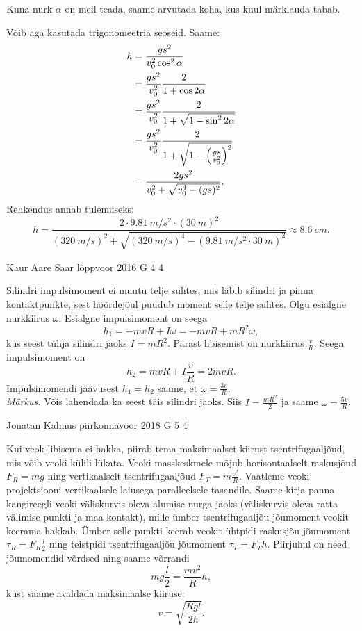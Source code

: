 \documentclass[11pt]{article}
\begin{document}
{{Kuna nurk $\alpha$ on meil teada, saame arvutada koha, kus kuul märklauda tabab.

Võib aga kasutada trigonomeetria seoseid. Saame:
\begin{align*}
h & = {gs^2 \over v_{0}^2\cos^2\alpha}\\
& = {gs^2 \over v_{0}^2}{2 \over 1+\cos2\alpha}\\
& = {gs^2 \over v_{0}^2}{2 \over 1+\sqrt{1-\sin^2 2\alpha}}\\
& = {gs^2 \over v_{0}^2}{2 \over 1+\sqrt{1-\Big({gs \over v_0^2}\Big)^2}}\\
& = {2gs^2 \over v_0^2+\sqrt{v_0^4-(gs)^2}}.
\end{align*}
Rehkendus annab tulemuseks:
$$
h = \frac{2\cdot \SI{9,81}{m/s^2} \cdot (\SI{30}{m})^2}{(\SI{320}{m/s})^2+\sqrt{(\SI{320}{m/s})^4-(\SI{9,81}{m/s^2} \cdot \SI{30}{m})^2}} \approx \SI{8,6}{cm}.
$$
\fi
}

{Kaur Aare Saar} %
{lõppvoor} %
{2016} %
{G 4} %
{4} %
{

\ifSolution
Silindri impulsimoment ei muutu telje suhtes, mis läbib silindri ja pinna kontaktpunkte, sest hõõrdejõul puudub moment selle telje suhtes. Olgu esialgne nurkkiirus $\omega$. Esialgne impulsimoment on seega
\[
h_1=-mvR+I\omega=-mvR+mR^2\omega,
\]
kus seest tühja silindri jaoks $I=mR^2$. Pärast libisemist on nurkkiirus $\frac{v}{R}$. Seega impulsimoment on
\[
h_2=mvR+I\frac{v}{R}=2mvR.
\]
Impulsimomendi jäävusest $h_1=h_2$ saame, et $\omega=\frac{3v}{R}$.\\
\emph{Märkus.} Võis lahendada ka seest täis silindri jaoks. Siis $I=\frac{mR^2}{2}$ ja saame $\omega = \frac{5v}{R}$.
\fi
}

{Jonatan Kalmus} %
{piirkonnavoor} %
{2018} %
{G 5} %
{4} %
{

\ifSolution
Kui veok libisema ei hakka, piirab tema maksimaalset kiirust tsentrifugaaljõud, mis võib veoki külili lükata. Veoki masskeskmele mõjub horisontaalselt raskusjõud $F_R=mg$ ning vertikaalselt tsentrifugaaljõud $F_T=m\frac{v^2}{R}$. 
Vaatleme veoki projektsiooni vertikaalsele laiusega paralleelsele tasandile. Saame kirja panna kangireegli veoki väliskurvis oleva alumise nurga jaoks (väliskurvis oleva ratta välimise punkti ja maa kontakt), mille ümber tsentrifugaaljõu jõumoment veokit keerama hakkab. Ümber selle punkti keerab veokit ühtpidi raskusjõu jõumoment $\tau_R=F_R\frac{l}{2}$ ning teistpidi tsentrifugaaljõu jõumoment $\tau_T=F_T h$. Piirjuhul on need jõumomendid võrdsed ning saame võrrandi
$$mg\frac{l}{2}=\frac{mv^2}{R}h,$$ 
kust saame avaldada maksimaalse kiiruse:
$$v=\sqrt{\frac{Rgl}{2h}}.$$ 
\fi
}

}
\end{document}
